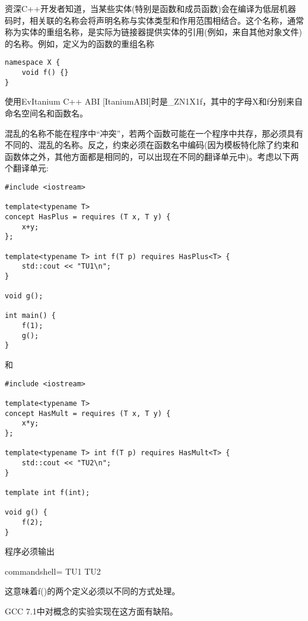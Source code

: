 
资深C++开发者知道，当某些实体(特别是函数和成员函数)会在编译为低层机器码时，相关联的名称会将声明名称与实体类型和作用范围相结合。这个名称，通常称为实体的重组名称，是实际为链接器提供实体的引用(例如，来自其他对象文件)的名称。例如，定义为的函数的重组名称

\begin{lstlisting}[style=styleCXX]
namespace X {
	void f() {}
}
\end{lstlisting}

使用EvItanium C++ ABI [ItaniumABI]时是\_ZN1X1f，其中的字母X和f分别来自命名空间名和函数名。

混乱的名称不能在程序中“冲突”，若两个函数可能在一个程序中共存，那必须具有不同的、混乱的名称。反之，约束必须在函数名中编码(因为模板特化除了约束和函数体之外，其他方面都是相同的，可以出现在不同的翻译单元中)。考虑以下两个翻译单元:

\begin{lstlisting}[style=styleCXX]
#include <iostream>

template<typename T>
concept HasPlus = requires (T x, T y) {
	x+y;
};

template<typename T> int f(T p) requires HasPlus<T> {
	std::cout << "TU1\n";
}

void g();

int main() {
	f(1);
	g();
}
\end{lstlisting}

和

\begin{lstlisting}[style=styleCXX]
#include <iostream>

template<typename T>
concept HasMult = requires (T x, T y) {
	x*y;
};

template<typename T> int f(T p) requires HasMult<T> {
	std::cout << "TU2\n";
}

template int f(int);

void g() {
	f(2);
}
\end{lstlisting}

程序必须输出

\begin{tcblisting}{commandshell={}}
TU1
TU2
\end{tcblisting}

这意味着f()的两个定义必须以不同的方式处理。

\begin{tcolorbox}[colback=webgreen!5!white,colframe=webgreen!75!black]
\hspace*{0.75cm}GCC 7.1中对概念的实验实现在这方面有缺陷。
\end{tcolorbox}























